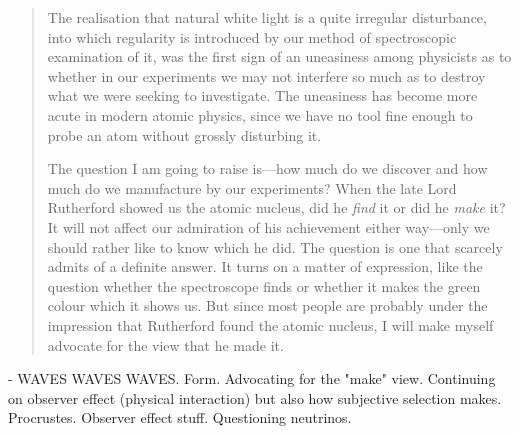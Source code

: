 \begin{quote}
    The realisation that natural white light is a quite irregular disturbance, into which regularity is introduced by our method of spectroscopic examination of it, was the first sign of an uneasiness among physicists as to whether in our experiments we may not interfere so much as to destroy what we were seeking to investigate.  The uneasiness has become more acute in modern atomic physics, since we have no tool fine enough to probe an atom without grossly disturbing it.  

    The question I am going to raise is---how much do we discover and how much do we manufacture by our experiments?  When the late Lord Rutherford showed us the atomic nucleus, did he \emph{find} it or did he \emph{make} it?  It will not affect our admiration of his achievement either way---only we should rather like to know which he did.  The question is one that scarcely admits of a definite answer.  It turns on a matter of expression, like the question whether the spectroscope finds or whether it makes the green colour which it shows us.  But since most people are probably under the impression that Rutherford found the atomic nucleus, I will make myself advocate for the view that he made it.

    \citep[p. 108-109]{Eddington1939}
\end{quote}

- WAVES WAVES WAVES.  Form.  Advocating for the "make" view.  Continuing on observer effect (physical interaction) but also how subjective selection makes.  Procrustes.  Observer effect stuff.  Questioning neutrinos.

